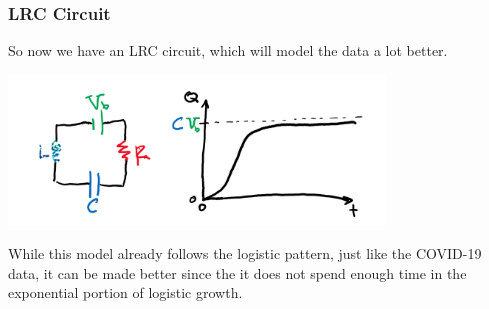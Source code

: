 \documentclass{report}
\begin{document}
            \subsubsection{LRC Circuit}
                So now we have an LRC circuit, which will model the data a lot better.
                \begin{center}
                    \includegraphics[width=10cm]{drawings/LRC.png}
                \end{center}
                While this model already follows the logistic pattern, just like the COVID-19 data, it can be made better since the it does not spend enough time in the exponential portion of logistic growth.
\end{document}
